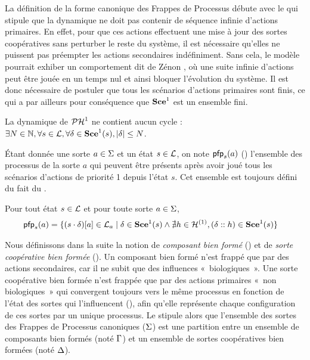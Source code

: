 La définition de la forme canonique des Frappes de Processus débute avec le
 qui stipule que la dynamique ne doit pas contenir de séquence infinie
d'actions primaires.
En effet, pour que ces actions effectuent une mise à jour des sortes coopératives sans perturber
le reste du système, il est nécessaire qu'elles ne puissent pas préempter les actions secondaires
indéfiniment.
Sans cela, le modèle pourrait exhiber un comportement dit de Zénon \cite{zhang92zeno},
où une suite infinie d'actions peut être jouée en un temps nul et ainsi
bloquer l'évolution du système.
Il est donc nécessaire de postuler que tous les scénarios d'actions primaires sont finis,
ce qui a par ailleurs pour conséquence que $\mathbf{Sce}^1$ est un ensemble fini.

\begin{critere}
  La dynamique de $\mathcal{PH}^1$ ne contient aucun cycle :
  $\exists N \in \mathbb{N}, \forall s \in \mathcal{L}, \forall \delta \in \mathbf{Sce}^1(s),
    |\delta| \leq N$.
\end{critere}

Étant donnée une sorte $a \in \Sigma$ et un état $s \in \mathcal{L}$,
on note $\mathsf{pfp}_s(a)$ () l'ensemble des processus de la sorte $a$ qui peuvent être présents
après avoir joué tous les scénarios d'actions de priorité 1 depuis l'état $s$.
Cet ensemble est toujours défini du fait du .

\begin{definition}[$\pfp : \PHl \times \PHs \rightarrow \powerset(\PHproc)$]
  Pour tout état $s \in \mathcal{L}$ et pour toute sorte $a \in \Sigma$,
  \begin{align*}
    \mathsf{pfp}_s(a) = \{ (s\cdot\delta)[{a}] \in \mathcal{L}_a &\mid \delta \in \mathbf{Sce}^1(s)
          \wedge\nexists h\in\mathcal{H}^{(1)}, (\delta :: h) \in \mathbf{Sce}^1(s) \}
  \end{align*}
\end{definition}

Nous définissons dans la suite la notion de \emph{composant bien formé} ()
et de \emph{sorte coopérative bien formée} ().
Un composant bien formé n'est frappé que par des actions secondaires,
car il ne subit que des influences «~biologiques~».
Une sorte coopérative bien formée n'est frappée que par des actions primaires «~non biologiques~»
qui convergent toujours vers le même processus en fonction de l'état des sortes qui l'influencent
(), afin qu'elle représente chaque configuration de ces sortes par un unique processus.
Le  stipule alors que l'ensemble des sortes des Frappes de Processus canoniques
($\Sigma$) est une partition entre un ensemble de composants bien formés (noté $\mathrm{\Gamma}$)
et un ensemble de sortes coopératives bien formées (noté $\Delta$).

